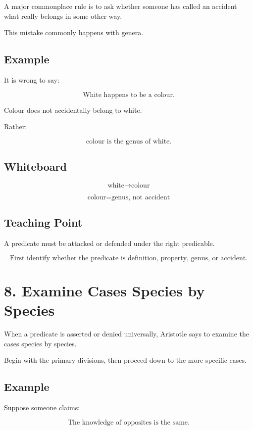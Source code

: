 \documentclass[12pt]{article}
\begin{document}
A major commonplace rule is to ask whether someone has called an accident what
really belongs in some other way.

This mistake commonly happens with genera.

\subsection*{Example}

It is wrong to say:

\[
\text{White happens to be a colour.}
\]

Colour does not accidentally belong to white.

Rather:

\[
\text{colour is the genus of white.}
\]

\subsection*{Whiteboard}

\[
\text{white} \rightarrow \text{colour}
\]

\[
\text{colour} = \text{genus, not accident}
\]

\subsection*{Teaching Point}

A predicate must be attacked or defended under the right predicable.

\[
\boxed{
\text{First identify whether the predicate is definition, property, genus, or accident.}
}
\]

\section*{8. Examine Cases Species by Species}

When a predicate is asserted or denied universally, Aristotle says to examine
the cases species by species.

Begin with the primary divisions, then proceed down to the more specific cases.

\subsection*{Example}

Suppose someone claims:

\[
\text{The knowledge of opposites is the same.}
\]
\end{document}
